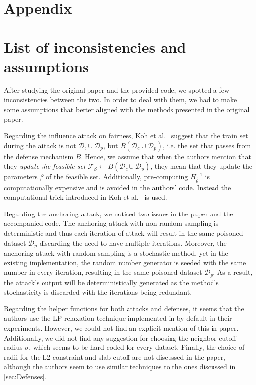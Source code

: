 \newpage
\section*{Appendix}
\appendix
\section{List of inconsistencies and assumptions}
\label{app:inconsistencies}
After studying the original paper and the provided code, we spotted a few inconsistencies between the two. In order to deal with them, we had to make some assumptions that better aligned with the methods presented in the original paper.

Regarding the influence attack on fairness, Koh et al.~\cite{koh2018} suggest that the train set during the attack is not $\mathcal{D}_c \cup \mathcal{D}_p$, but $B(\mathcal{D}_c \cup \mathcal{D}_p)$, i.e. the set that passes from the defense mechanism $B$. Hence, we assume that when the authors mention that they \textit{update the feasible set $\mathcal{F}_{\beta} \leftarrow B(\mathcal{D}_c \cup \mathcal{D}_p)$}, they mean that they update the parameters $\beta$ of the feasible set. Additionally, pre-computing $H^{-1}_{\hat{\theta}}$ is computationally expensive and is avoided in the authors' code. Instead the computational trick introduced in Koh et al.~\cite{koh2017} is used.

Regarding the anchoring attack, we noticed two issues in the paper and the accompanied code. The anchoring attack with non-random sampling is deterministic and thus each iteration of attack will result in the same poisoned dataset $\mathcal{D}_p$ discarding the need to have multiple iterations. Moreover, the anchoring attack with random sampling is a stochastic method, yet in the existing implementation, the random number generator is seeded with the same number in every iteration, resulting in the same poisoned dataset $\mathcal{D}_p$. As a result, the attack's output will be deterministically generated as the method's stochasticity is discarded with the iterations being redundant.

Regarding the helper functions for both attacks and defenses, it seems that the authors use the LP relaxation technique implemented in \cite{koh2018} by default in their experiments. However, we could not find an explicit mention of this in paper. Additionally, we did not find any suggestion for choosing the neighbor cutoff radius $\sigma$, which seems to be hard-coded for every dataset. Finally, the choice of radii for the L2 constraint and slab cutoff are not discussed in the paper, although the authors seem to use similar techniques to the ones discussed in \ref{sec:Defenses}.


